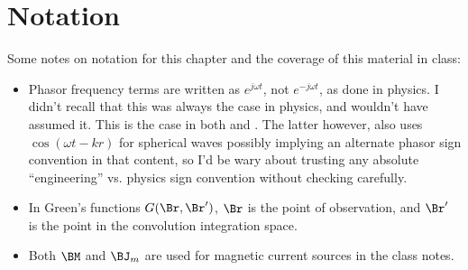 %
%
\section{Notation}
%
Some notes on notation for this chapter and the coverage of this material in class:
%
\begin{itemize}
\item Phasor frequency terms are written as \( e^{j \omega t} \), not \( e^{-j \omega t} \), as done in physics.  I didn't recall that this was always the case in physics, and wouldn't have assumed it.  This is the case in both \citep{jackson1975cew:simpleRadiating} and \citep{griffiths1999introduction:waves}.  The latter however, also uses \( \cos(\omega t - k r) \) for spherical waves possibly implying an alternate phasor sign convention in that content, so I'd be wary about trusting any absolute ``engineering'' vs. physics sign convention without checking carefully.
\item In Green's functions \( G(\Br, \Br') \), \( \Br \) is the point of observation, and \( \Br' \) is the point in the convolution integration space.
\item Both \( \BM \) and \( \BJ_m \) are used for magnetic current sources in the class notes.
\end{itemize}


